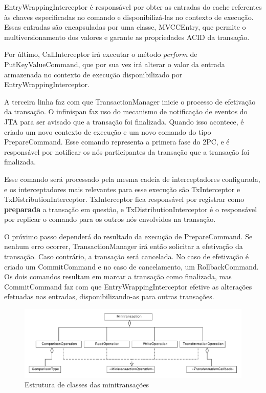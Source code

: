 \documentclass[11pt,twoside,a4paper]{book}
\begin{document}
EntryWrappingInterceptor é responsável por obter as entradas do cache referentes às chaves especificadas no comando e disponibilizá-las no contexto de execução. Essas entradas são encapsuladas por uma classe, MVCCEntry, que permite o multiversionamento dos valores e garante as propriedades ACID da transação.

Por último, CallInterceptor irá executar o método \emph{perform} de PutKeyValueCommand, que por sua vez irá alterar o valor da entrada armazenada no contexto de execução disponibilizado por EntryWrappingInterceptor.

A terceira linha faz com que TransactionManager inicie o processo de efetivação da transação. O infinispan faz uso do mecanismo de notificação de eventos do JTA para ser avisado que a transação foi finalizada. Quando isso acontece, é criado um novo contexto de execução e um novo comando do tipo PrepareCommand. Esse comando representa a primera fase do 2PC, e é responsável por notificar os nós participantes da transação que a transação foi finalizada. 

Esse comando será processado pela mesma cadeia de interceptadores configurada, e os interceptadores mais relevantes para esse execução são TxInterceptor e TxDistributionInterceptor. TxInterceptor fica responsável por registrar como \textbf{preparada} a transação em questão, e TxDistributionInterceptor é o responsável por replicar o comando para os outros nós envolvidos na transação.

O próximo passo dependerá do resultado da execução de PrepareCommand. Se nenhum erro ocorrer, TransactionManager irá então solicitar a efetivação da transação. Caso contrário, a transação será cancelada. No caso de efetivação é criado um CommitCommand e no caso de cancelamento, um RollbackCommand. Os dois comandos resultam em marcar a transação como finalizada, mas CommitCommand faz com que EntryWrappingInterceptor efetive as alterações efetuadas nas entradas, disponibilizando-as para outras transações.



\begin{figure}
  \centering
  \includegraphics[width=\textwidth]{transaction_operations} 
  \caption{Estrutura de classes das minitransações}
  \label{fig:transaction_operations} 
\end{figure}
\end{document}
